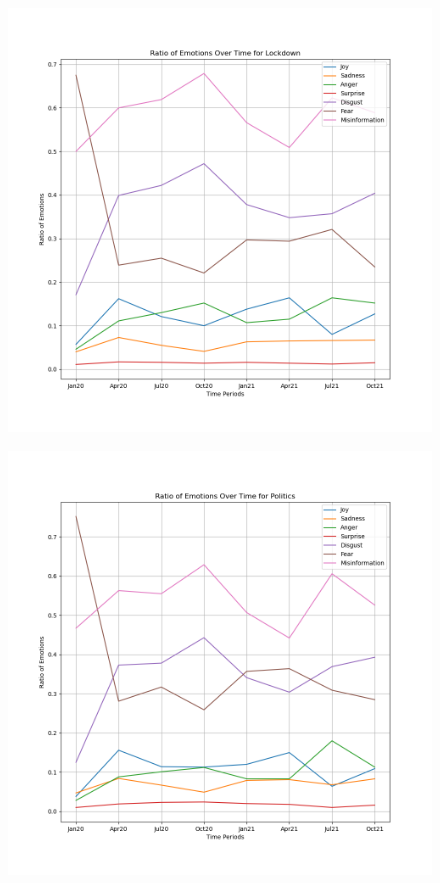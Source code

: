 \documentclass{l4proj}
\begin{document}
\begin{appendices}
\begin{figure}[H]
\begin{minipage}[c]{0.49\linewidth}
\centering
\includegraphics[width=\textwidth]{images/LockdownEmotion.png}
\label{fig:lockemo}
\end{minipage}\hfill
\begin{minipage}[c]{0.49\linewidth}
\centering
\includegraphics[width=\textwidth]{images/PoliticsEmotion.png}
\label{fig:polemo}
\end{minipage}
\end{figure}

\end{appendices}
\end{document}
